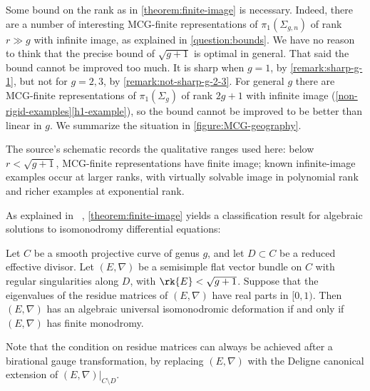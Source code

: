 \begin{remark}
\notready
	\label{remark:}
	Some bound on the rank as in \autoref{theorem:finite-image} is
	necessary. Indeed, there are a number of interesting MCG-finite representations of $\pi_1(\Sigma_{g,n})$ of rank $r\gg g$ with infinite image, as explained in \autoref{question:bounds}.
	We have no reason to think that the precise bound of
	$\sqrt{g+1}$ is optimal in general.
	That said the bound cannot be improved too much. It is sharp when $g=1$,
	by \autoref{remark:sharp-g-1}, but not for $g=2,3$, by \autoref{remark:not-sharp-g-2-3}.
	For general $g$ there are MCG-finite representations of $\pi_1(\Sigma_g)$ of rank
	$2g+1$ with infinite image (\autoref{non-rigid-examples}\eqref{h1-example}), so the bound cannot be improved to be better than linear in $g$.
	We summarize the situation in \autoref{figure:MCG-geography}.
\end{remark}

\begin{remark}
\label{figure:MCG-geography}
The source's schematic records the qualitative ranges used here:
below $r<\sqrt{g+1}$, MCG-finite representations have finite image; known
infinite-image examples occur at larger ranks, with virtually solvable image
in polynomial rank and richer examples at exponential rank.
\end{remark}

As explained in ~\cite[Theorem A]{CH:isomonodromic},
\autoref{theorem:finite-image} yields a classification result for algebraic solutions to isomonodromy differential equations:
\begin{corollary}
\notready
	Let $C$ be a smooth projective curve of genus $g$, and let $D\subset C$
	be a reduced effective divisor. Let $({E},\nabla)$ be a semisimple flat
	vector bundle on $C$ with regular singularities along $D$, with $\rk
	{E}<\sqrt{g+1}$. Suppose that the eigenvalues of the residue matrices of
	$({E},\nabla)$ have real parts in $[0,1)$. Then $({E},\nabla)$ has an algebraic universal isomonodromic deformation if and only if $({E},\nabla)$ has finite monodromy.
\end{corollary}
Note that the condition on residue matrices can always be achieved after a birational gauge transformation, by replacing $({E}, \nabla)$ with the Deligne canonical extension of $({E}, \nabla)|_{C\setminus D}$.

